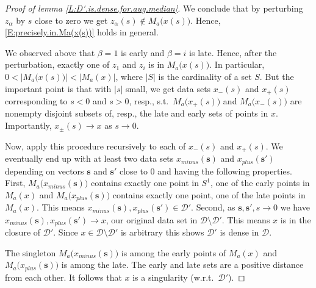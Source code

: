 \documentclass[10pt,a4paper]{amsart}
\newcommand{\D}{\mathcal{D}}
\newcommand{\mbf}{\mathbf}
\begin{document}
\begin{proof}[Proof of lemma \ref{L:D'.is.dense.for.aug.median}]
We conclude that by perturbing $z_{\alpha}$ by $s$ close to zero we get $z_{\alpha}(s) \notin M_{a} \bigl( x(s) \bigr)$. Hence, \eqref{E:precisely.in.Ma(x(s))} holds in general.

We observed above that $\beta = 1$ is early and $\beta = i$ is late. Hence, after the perturbation, exactly one of $z_{1}$ and $z_{i}$ is in $M_{a} \bigl( x(s) \bigr)$. In particular, $0 < \bigl| M_{a} \bigl( x(s) \bigr) \bigr| < \bigl| M_{a}(x) \bigr|$, 
where $|S|$ is the cardinality of a set $S$. But the important point is that with $|s|$ small, we get data sets $x_{-}(s)$ and $x_{+}(s)$ corresponding to $s<0$ and $s>0$, resp., s.t.\ $M_{a} \bigl( x_{+}(s) \bigr)$ and $M_{a} \bigl( x_{-}(s) \bigr)$ 
are nonempty disjoint subsets of, resp., the late and early sets of points in $x$. 
Importantly, $x_{\pm}(s) \to x$ as $s \to 0$. 

Now, apply this procedure recursively to each of $x_{-}(s)$ and $x_{+}(s)$. We eventually end up with at least two data sets $x_{minus}(\mbf{s})$ and 
$x_{plus}(\mbf{s}')$ depending on vectors $\mbf{s}$ and $\mbf{s}'$ close to 0 and having the following properties. First, $M_{a}\bigl( x_{minus}(\mbf{s}) \bigr)$ contains exactly one point in $S^{1}$, one of the early points in $M_{a}(x)$ and $M_{a}\bigl( x_{plus}(\mbf{s}) \bigr)$ contains exactly one point, one of the late points in $M_{a}(x)$. This means 
$x_{minus}(\mbf{s}), x_{plus}(\mbf{s}') \in \D'$. Second, 
as $\mbf{s}, \mbf{s}', s \to 0$ we have 
$x_{minus}(\mbf{s}), x_{plus}(\mbf{s}') \to x$, our original data set 
in $\D \setminus \D'$. This means $x$ is in the closure of $\D'$. 
Since $x \in \D \setminus \D'$ is arbitrary this shows $\D'$ is dense in $\D$. 

The singleton $M_{a}\bigl( x_{minus}(\mbf{s}) \bigr)$ is among the early points of $M_{a}(x)$ and $M_{a}\bigl( x_{plus}(\mbf{s}) \bigr)$ is among the late. The early and late sets are a positive distance from each other. It follows that $x$ is a singularity (w.r.t.\ $\D'$). 
  \end{proof}
\end{document}
